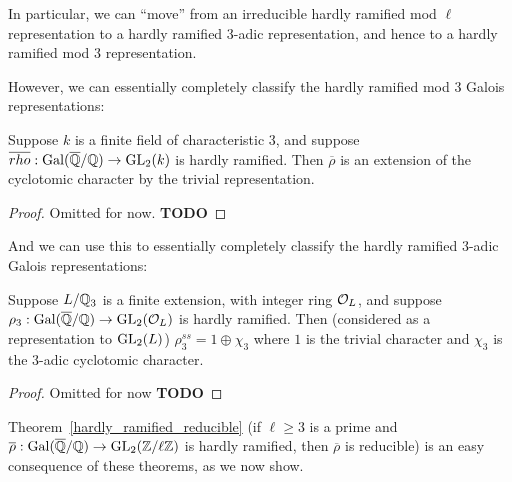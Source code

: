 In particular, we can ``move'' from an irreducible hardly ramified mod $\ell$ representation
to a hardly ramified 3-adic representation, and hence to a hardly ramified mod 3 representation.

However, we can essentially completely classify the hardly ramified mod 3 Galois representations:

\begin{theorem}
  \label{hardly_ramified_mod3_reducible}
  \leanok
  Suppose $k$ is a finite field of characteristic 3, and suppose
  $\overline{rho}:\operatorname{Gal}(\overline{\mathbb{Q}}/\mathbb{Q})\to\operatorname{GL}_2(k)$ is hardly ramified. Then $\overline{\rho}$ is an extension
  of the cyclotomic character by the trivial representation.
\end{theorem}
\begin{proof}
  Omitted for now. {\bf TODO}
\end{proof}

And we can use this to essentially completely classify the hardly ramified 3-adic Galois
representations:

\begin{theorem}
  \label{hardly_ramified_3adic_reducible}
  \leanok
  Suppose $L/\mathbb{Q}_3$ is a finite extension, with integer ring $\mathcal{O}_L$, and suppose
  $\rho_3:\operatorname{Gal}(\overline{\mathbb{Q}}/\mathbb{Q})\to\operatorname{GL}_2(\mathcal{O}_L)$ is hardly ramified. Then (considered as a representation
  to $\operatorname{GL}_2(L)$) $\rho_3^{ss}=1\oplus\chi_3$
  where $1$ is the trivial character and $\chi_3$ is the 3-adic cyclotomic character.
\end{theorem}
\begin{proof}
  Omitted for now {\bf TODO}
\end{proof}

Theorem~\ref{hardly_ramified_reducible} (if $\ell\geq 3$ is a prime and
$\overline{\rho}:\operatorname{Gal}(\overline{\mathbb{Q}}/\mathbb{Q})\to\operatorname{GL}_2(\mathbb{Z}/\ell\mathbb{Z})$ is hardly ramified,
then $\overline{\rho}$ is reducible) is an easy consequence of these theorems,
as we now show.

